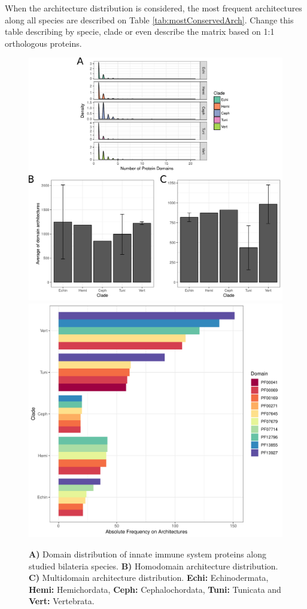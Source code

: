\documentclass[11pt]{article}
\newcommand{\TODO}[1]{\begingroup\color{red}#1\endgroup}
\begin{document}
When the architecture distribution is considered, the most frequent 
architectures along all species are described on 
Table \ref{tab:mostConservedArch}. \TODO{Change this table describing by 
specie, clade or even describe the matrix based on 1:1 orthologous proteins.}

\begin{figure}[ht!]
\centering
\includegraphics[scale=0.73]{figures/completeDistributionDomains} \\
\includegraphics[scale=0.38]{figures/heterodomains_distr}
\caption{\textbf{A)} Domain distribution of innate immune system proteins along 
studied 
bilateria species. \textbf{B)} Homodomain architecture distribution. 
\textbf{C)} Multidomain architecture distribution. \textbf{Echi:} 
Echinodermata, \textbf{Hemi:} Hemichordata, \textbf{Ceph:} Cephalochordata, 
\textbf{Tuni:} Tunicata and \textbf{Vert:} Vertebrata.}
\label{fig:domainDistr}
\end{figure}
\end{document}
